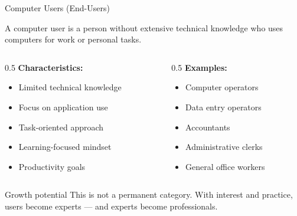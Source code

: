 \documentclass[aspectratio=169]{beamer}
\begin{document}
\begin{frame}{Computer Users (End-Users)}
  \begin{definition}
    A computer user is a person without extensive technical knowledge who uses
    computers for work or personal tasks.
  \end{definition}
  \vspace{0.4cm}
  \begin{columns}[T]
    \begin{column}{0.5\textwidth}
      \textbf{Characteristics:}
      \begin{itemize}
        \item Limited technical knowledge
        \item Focus on application use
        \item Task-oriented approach
        \item Learning-focused mindset
        \item Productivity goals
      \end{itemize}
    \end{column}
    \begin{column}{0.5\textwidth}
      \textbf{Examples:}
      \begin{itemize}
        \item Computer operators
        \item Data entry operators
        \item Accountants
        \item Administrative clerks
        \item General office workers
      \end{itemize}
    \end{column}
  \end{columns}
  \vspace{0.3cm}
  \begin{exampleblock}{Growth potential}
    This is not a permanent category. With interest and practice, users become
    experts --- and experts become professionals.
  \end{exampleblock}
\end{frame}
\end{document}

